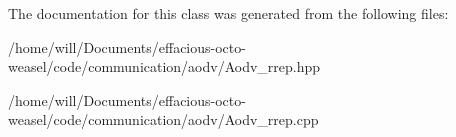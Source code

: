 The documentation for this class was generated from the following files\+:\begin{DoxyCompactItemize}
\item 
/home/will/\+Documents/effacious-\/octo-\/weasel/code/communication/aodv/Aodv\+\_\+rrep.\+hpp\item 
/home/will/\+Documents/effacious-\/octo-\/weasel/code/communication/aodv/Aodv\+\_\+rrep.\+cpp\end{DoxyCompactItemize}
